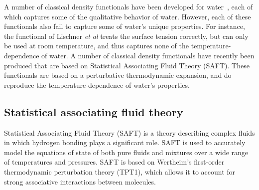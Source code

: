 \documentclass[letterpaper,twocolumn,amsmath,amssymb,prb]{revtex4-1}
\begin{document}
A number of classical density functionals have been developed for
water~\cite{ding1987, Yang1992, yang1994density, gloor2002saft, 
  gloor2004accurate, gloor2007prediction, Jaqaman2004, clark2006developing,
  lischner2010classical, fu2005vapor-liquid-dft,kiselev2006new,
  blas2001examination}, each of which
captures some of the qualitative behavior of water.  However, each of
these functionals also fail to capture some of water's unique
properties.  For instance, the functional of Lischner \emph{et
  al}\cite{lischner2010classical} treats the surface tension
correctly, but can only be used at room temperature, and thus captures
none of the temperature-dependence of water.  A number of classical
density functionals have recently been produced that are based on
Statistical Associating Fluid Theory (SAFT)\cite{ 
  yu2002fmt-dft-inhomogeneous-associating,
  fu2005vapor-liquid-dft,gloor2002saft,muller2001molecular,
  clark2006developing, gloor2007prediction, gloor2004accurate,
  gross2009density, kahl2008modified, blas2001examination}.  These
functionals are based on a perturbative thermodynamic expansion, and
do reproduce the temperature-dependence of water's properties.

\subsection{Statistical associating fluid theory}

Statistical Associating Fluid Theory (SAFT) is a theory describing
complex fluids in which hydrogen bonding plays a significant
role\cite{muller2001molecular}.  SAFT is used to accurately model the
equations of state of both pure fluids and mixtures over a wide range
of temperatures and pressures.  SAFT is
based on Wertheim's first-order thermodynamic perturbation theory
(TPT1)\cite{wertheim1984fluidsI, wertheim1984fluidsII,
  wertheim1986fluidsIII, wertheim1986fluidsIV}, which allows it to
account for strong associative interactions between molecules.
\end{document}
